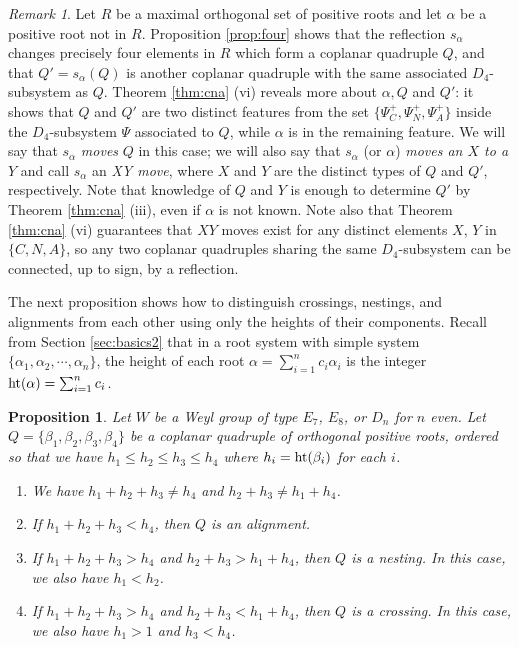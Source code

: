 \documentclass[11pt]{amsart}
\theoremstyle{plain}
\newtheorem{prop}[theorem]{Proposition}
\theoremstyle{definition}
\theoremstyle{remark}
\newtheorem{rmk}[theorem]{Remark}
\numberwithin{equation}{subsection}
\newcommand{\al}{\alpha}
\newcommand{\be}{\beta}
\newcommand{\coplanar}{coplanar\xspace}
\newcommand{\rootht}{\text{\rm ht}}
\begin{document}
\begin{rmk}\label{rmk:moves}
Let $R$ be a maximal orthogonal set of positive roots and let $\alpha$ be a
positive root not in $R$. Proposition \ref{prop:four} shows that the reflection
$s_\alpha$ changes precisely four elements in $R$ which form a \coplanar
quadruple $Q$, and that $Q'=s_\al(Q)$ is another \coplanar quadruple with the
same associated $D_4$-subsystem as $Q$. Theorem \ref{thm:cna} (vi) reveals more
about $\al,Q$ and $Q'$: it shows that $Q$ and $Q'$ are two distinct features
from the set $\{\Psi^+_C,\Psi^+_N,\Psi^+_A\}$ inside the $D_4$-subsystem $\Psi$
associated to $Q$, while $\al$ is in the remaining feature.  We will say that
$s_\alpha$ \emph{moves} $Q$ in this case; we will also say that $s_\alpha$ (or
$\al$) \emph{moves an $X$ to a $Y$} and call $s_\al$ an \emph{XY move}, where
$X$ and $Y$ are the distinct types of $Q$ and $Q'$, respectively. Note that
knowledge of $Q$ and $Y$ is enough to determine $Q'$ by Theorem \ref{thm:cna}
(iii), even if $\al$ is not known. Note also that Theorem \ref{thm:cna} (vi)
guarantees that $XY$ moves exist for any distinct elements $X$, $Y$ in
$\{C,N,A\}$, so any two coplanar quadruples sharing the same $D_4$-subsystem can
be connected, up to sign, by a reflection.
\end{rmk}

The next proposition shows how to distinguish crossings, nestings, and
alignments from each other using only the heights of their components. Recall
from Section \ref{sec:basics2} that in a root system with simple system $\{\alpha_1,\al_2,
\cdots,\al_n\}$, the height of each root $\al=\sum_{i=1}^n c_i\al_i$ is the
integer $\rootht(\al)=\sum_{i=1}^n c_i$.

\begin{prop}\label{prop:htseq}
Let $W$ be a Weyl group of type $E_7$, $E_8$, or $D_n$ for $n$ even. Let $Q =
\{\be_1, \be_2, \be_3, \be_4\}$ be a \coplanar quadruple of orthogonal positive
roots, ordered so that we have $h_1 \leq h_2 \leq h_3 \leq h_4$ where $h_i=\rootht(\be_i)$ for each $i$.
\begin{enumerate}
    \item[{\rm (i)}]{We have $h_1 + h_2 + h_3 \ne h_4$ and $h_2 + h_3 \ne h_1 +
     h_4$.}
 \item[{\rm (ii)}]{If $h_1 + h_2 + h_3 < h_4$, then $Q$ is an alignment.}
 \item[{\rm (iii)}]{If $h_1 + h_2 + h_3 > h_4$ and $h_2 + h_3 > h_1 + h_4$, then
     $Q$ is a nesting. In this case, we also have $h_1 < h_2$.}
 \item[{\rm (iv)}]{If $h_1 + h_2 + h_3 > h_4$ and $h_2 + h_3 < h_1 + h_4$, then
     $Q$ is a crossing. In this case, we also have $h_1 > 1$ and $h_3 < h_4$.}
\end{enumerate}
\end{prop}
\end{document}
